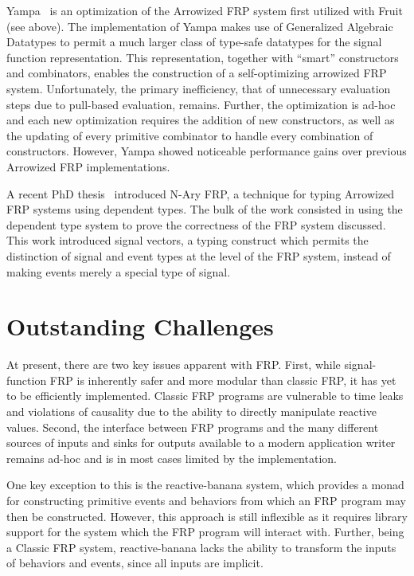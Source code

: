 Yampa~\cite{Nilsson2005} is an optimization of the Arrowized FRP system first
utilized with Fruit (see above). The implementation of Yampa makes use of
Generalized Algebraic Datatypes to permit a much larger class of type-safe
datatypes for the signal function representation. This representation,
together with ``smart'' constructors and combinators, enables the construction
of a self-optimizing arrowized FRP system. Unfortunately, the primary
inefficiency, that of unnecessary evaluation steps due to pull-based evaluation,
remains. Further, the optimization is ad-hoc and each new optimization requires
the addition of new constructors, as well as the updating of every primitive
combinator to handle every combination of constructors. However, Yampa showed
noticeable performance gains over previous Arrowized FRP implementations.

A recent PhD thesis~\cite{Sculthorpe2011} introduced N-Ary FRP, a technique for
typing Arrowized FRP systems using dependent types. The bulk of the work
consisted in using the dependent type system to prove the correctness of the FRP
system discussed. This work introduced signal vectors, a typing construct
which permits the distinction of signal and event types at the level of the FRP
system, instead of making events merely a special type of signal.

\section{Outstanding Challenges}
\label{section:Background-outstanding_challenges}

At present, there are two key issues apparent with FRP. First, while
signal-function FRP is inherently safer and more modular than classic FRP, it
has yet to be efficiently implemented. Classic FRP programs are vulnerable to
time leaks and violations of causality due to the ability to directly manipulate
reactive values. Second, the interface between FRP programs and the many
different sources of inputs and sinks for outputs available to a modern
application writer remains ad-hoc and is in most cases limited by the
implementation.

One key exception to this is the reactive-banana system, which provides a monad
for constructing primitive events and behaviors from which an FRP program may
then be constructed. However, this approach is still inflexible as it requires
library support for the system which the FRP program will interact with.
Further, being a Classic FRP system, reactive-banana lacks the ability to
transform the inputs of behaviors and events, since all inputs are implicit.
